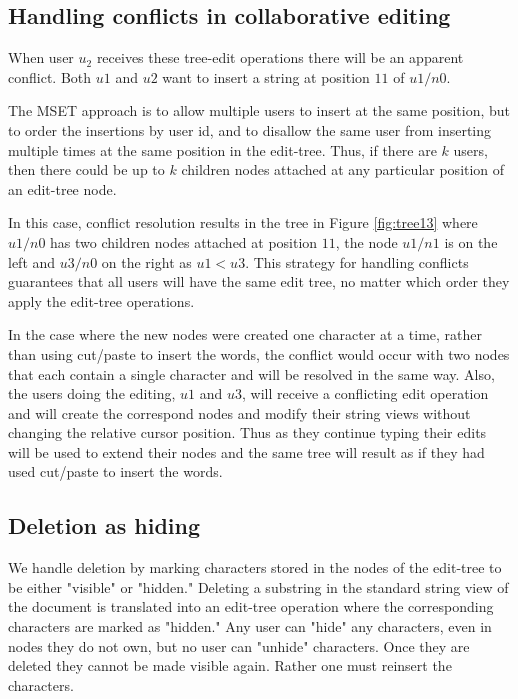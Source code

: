 \documentclass{amsart}
\begin{document}
\subsection{Handling conflicts in collaborative editing}
When user $u_2$ receives these tree-edit operations there will be an
apparent conflict. Both $u1$ and $u2$ want to insert a string at position
$11$ of $u1/n0$.  

The MSET approach is to allow multiple users to insert at
the same position, but to order the insertions by user id, and to disallow
the same user from inserting multiple times at the same position in the edit-tree.
Thus, if there are $k$ users, then there could be up to $k$ children nodes
attached at any particular position of an edit-tree node.

In this case, conflict resolution results in the tree in Figure
\ref{fig:tree13} where $u1/n0$ has two children nodes attached at position $11$,
the node $u1/n1$ is on the left and $u3/n0$ on the right as $u1<u3$.
This strategy for handling conflicts guarantees that all users will have
the same edit tree, no matter which order they apply the edit-tree operations.

In the case where the new nodes were created one character at a time, rather
than using cut/paste to insert the words, the conflict would occur with two
nodes that each contain a single character and will be resolved in the same
way.  Also, the users doing the editing, $u1$ and $u3$, will receive a
conflicting edit operation and will create the correspond nodes and modify
their string views without changing the relative cursor position. Thus as they
continue typing their edits will be used to extend their nodes and the
same tree will result as if they had used cut/paste to insert the words.


\subsection{Deletion as hiding}

We handle deletion by marking characters stored in the nodes of the edit-tree 
to be either "visible" or "hidden."  Deleting a substring in the standard string
view of the document is translated into an edit-tree operation where the
corresponding characters are marked as "hidden."  Any user can "hide" any
characters, even in nodes they do not own, but no user can "unhide" characters.
Once they are deleted they cannot be made visible again. Rather one must
reinsert the characters.
\end{document}
